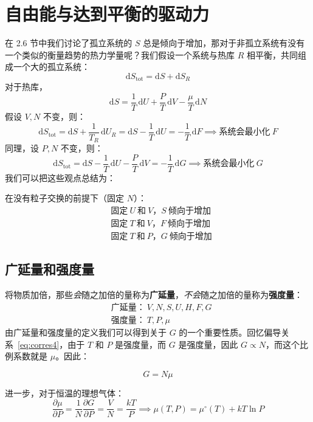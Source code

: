 \section{自由能与达到平衡的驱动力}
在 2.6 节中我们讨论了孤立系统的 $S$ 总是倾向于增加，那对于非孤立系统有没有一个类似的衡量趋势的热力学量呢？我们假设一个系统与热库 $R$ 相平衡，共同组成一个大的孤立系统：
\begin{equation}
    \mathrm{d}S_\mathrm{tot} = \mathrm{d}S + \mathrm{d}S_R
\end{equation}
对于热库，
\begin{equation}
    \mathrm{d}S=\frac{1}{T}\,\mathrm{d}U+\frac{P}{T}\,\mathrm{d}V-\frac{\mu}{T}\,\mathrm{d}N
\end{equation}
假设 $V,N$ 不变，则：
\begin{equation}
    \mathrm{d}S_{\mathrm{tot}}
    =\mathrm{d}S+\frac{1}{T_R}\,\mathrm{d}U_R
    =\mathrm{d}S-\frac{1}{T}\,\mathrm{d}U
    =-\frac{1}{T}\,\mathrm{d}F
    \implies \text{系统会最小化}\ F
\end{equation}
同理，设 $P,N$ 不变，则：
\begin{equation}
    \mathrm{d}S_{\mathrm{tot}}
    =\mathrm{d}S-\frac{1}{T}\,\mathrm{d}U-\frac{P}{T}\,\mathrm{d}V
    =-\frac{1}{T}\,\mathrm{d}G
    \implies \text{系统会最小化}\ G
\end{equation}
我们可以把这些观点总结为：
\begin{corollary}[系统自发变化的方向]
    在没有粒子交换的前提下（固定 $N$）：
    \begin{align}
        &\text{固定}\ U\ \text{和}\ V \text{，} S\ \text{倾向于增加}\\
        &\text{固定}\ T\ \text{和}\ V \text{，} F\ \text{倾向于增加}\\
        &\text{固定}\ T\ \text{和}\ P \text{，} G\ \text{倾向于增加}
    \end{align}
\end{corollary}

\subsection{广延量和强度量}
将物质加倍，那些\textit{会}随之加倍的量称为\textbf{广延量}，\textit{不会}随之加倍的量称为\textbf{强度量}：
\begin{align}
    &\text{广延量：}\ V,N,S,U,H,F,G\\
    &\text{强度量：}\ T,P,\mu
\end{align}
由广延量和强度量的定义我们可以得到关于 $G$ 的一个重要性质。回忆偏导关系~\eqref{eq:corres4}，由于 $T$ 和 $P$ 是强度量，而 $G$ 是强度量，因此 $G \propto N$，而这个比例系数就是 $\mu$。因此：
\begin{corollary}
    \begin{equation}
        G = N\mu
    \end{equation}
\end{corollary}
进一步，对于恒温的理想气体：
\begin{equation}
    \frac{\partial \mu}{\partial P}
    =\frac{1}{N}\frac{\partial G}{\partial P}
    =\frac{V}{N}
    =\frac{kT}{P}
    \implies \mu(T,P)=\mu^\circ(T)+kT\ln P
\end{equation}

